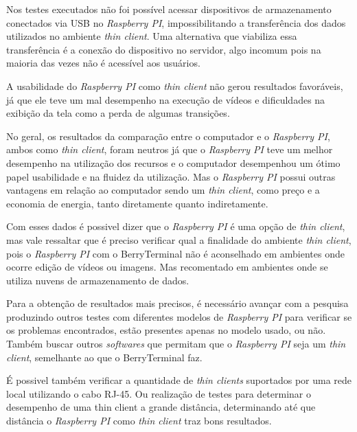 \documentclass[
	12pt,				%
	openright,			%
	twoside,			%
	a4paper,			%
	chapter=TITLE,		%
	english,			%
	brazil				%
	]{abntex2}
\begin{document}
Nos testes executados não foi possível acessar dispositivos de armazenamento conectados via USB no \textit{Raspberry PI}, impossibilitando a transferência dos dados utilizados no ambiente \textit{thin client}. Uma alternativa que viabiliza essa transferência é a conexão do dispositivo no servidor, algo incomum pois na maioria das vezes não é acessível aos usuários.

A usabilidade do \textit{Raspberry PI} como \textit{thin client} não gerou resultados favoráveis, já que ele teve um mal desempenho na execução de vídeos e dificuldades na exibição da tela como a perda de algumas transições.

No geral, os resultados da comparação entre o computador e o \textit{Raspberry PI}, ambos como \textit{thin client}, foram neutros já que o \textit{Raspberry PI} teve um melhor desempenho na utilização dos recursos e o computador desempenhou um ótimo papel usabilidade e na fluidez da utilização. Mas o \textit{Raspberry PI} possui outras vantagens em relação ao computador sendo um \textit{thin client}, como preço e a economia de energia, tanto diretamente quanto indiretamente.

Com esses dados é possivel dizer que o \textit{Raspberry PI} é uma opção de \textit{thin client}, mas vale ressaltar que é preciso verificar qual a finalidade do ambiente \textit{thin client}, pois o \textit{Raspberry PI} com o BerryTerminal não é aconselhado em ambientes onde ocorre edição de vídeos ou imagens. Mas recomentado em ambientes onde se utiliza nuvens de armazenamento de dados.

Para a obtenção de resultados mais precisos, é necessário avançar com a pesquisa produzindo outros testes com diferentes modelos de \textit{Raspberry PI} para verificar se os problemas encontrados, estão presentes apenas no modelo usado, ou não. Também buscar outros \textit{softwares} que permitam que o \textit{Raspberry PI} seja um \textit{thin client}, semelhante ao que o BerryTerminal faz.

É possivel também verificar a quantidade de \textit{thin clients} suportados por uma rede local utilizando o cabo RJ-45. Ou realização de testes para determinar o desempenho de uma thin client a grande distância, determinando até que distância o \textit{Raspberry PI} como \textit{thin client} traz bons resultados.  





\end{document}
